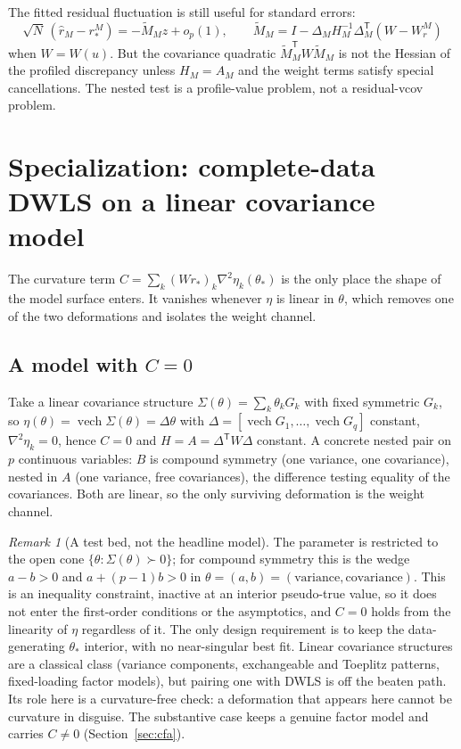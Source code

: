 \documentclass[11pt]{article}
\newcommand{\vech}{\operatorname{vech}}
\newcommand{\T}{^{\mathsf{T}}}
\newcommand{\Wr}{W_{\!r}}
\newcommand{\rs}{r_{*}}
\newcommand{\ths}{\theta_{*}}
\theoremstyle{plain}
\theoremstyle{remark}
\newtheorem*{remark}{Remark}
\begin{document}
The fitted residual fluctuation is still useful for standard errors:
\[
  \sqrt{N}\,(\hat r_{M}-\rs^{M})
  =-\widetilde M_{M}z+o_{p}(1),\qquad
  \widetilde M_{M}=I-\Delta_{M}H_{M}^{-1}\Delta_{M}\T(W-\Wr^{M})
\]
when $W=W(u)$. But the covariance quadratic
$\widetilde M_{M}\T W\widetilde M_{M}$ is not the Hessian of the profiled
discrepancy unless $H_{M}=A_{M}$ and the weight terms satisfy special
cancellations. The nested test is a profile-value problem, not a residual-vcov
problem.

\section{Specialization: complete-data DWLS on a linear covariance model}
\label{sec:dwls}

The curvature term $C=\sum_{k}(W\rs)_{k}\nabla^{2}\eta_{k}(\ths)$ is the only
place the shape of the model surface enters. It vanishes whenever $\eta$ is
linear in $\theta$, which removes one of the two deformations and isolates the
weight channel.

\subsection{A model with $C=0$}
Take a linear covariance structure $\Sigma(\theta)=\sum_{k}\theta_{k}G_{k}$ with
fixed symmetric $G_{k}$, so $\eta(\theta)=\vech\Sigma(\theta)=\Delta\theta$ with
$\Delta=[\vech G_{1},\dots,\vech G_{q}]$ constant, $\nabla^{2}\eta_{k}=0$, hence
$C=0$ and $H=A=\Delta\T W\Delta$ constant. A concrete nested pair on $p$
continuous variables: $B$ is compound symmetry (one variance, one covariance),
nested in $A$ (one variance, free covariances), the difference testing equality
of the covariances. Both are linear, so the only surviving deformation is the
weight channel.

\begin{remark}[A test bed, not the headline model]
The parameter is restricted to the open cone $\{\theta:\Sigma(\theta)\succ0\}$;
for compound symmetry this is the wedge $a-b>0$ and $a+(p-1)b>0$ in
$\theta=(a,b)=(\text{variance},\text{covariance})$. This is an inequality
constraint, inactive at an interior pseudo-true value, so it does not enter the
first-order conditions or the asymptotics, and $C=0$ holds from the linearity of
$\eta$ regardless of it. The only design requirement is to keep the
data-generating $\theta_{*}$ interior, with no near-singular best fit. Linear
covariance structures are a classical class (variance components, exchangeable
and Toeplitz patterns, fixed-loading factor models), but pairing one with DWLS is
off the beaten path. Its role here is a curvature-free check: a deformation that
appears here cannot be curvature in disguise. The substantive case keeps a
genuine factor model and carries $C\neq0$ (Section~\ref{sec:cfa}).
\end{remark}
\end{document}
